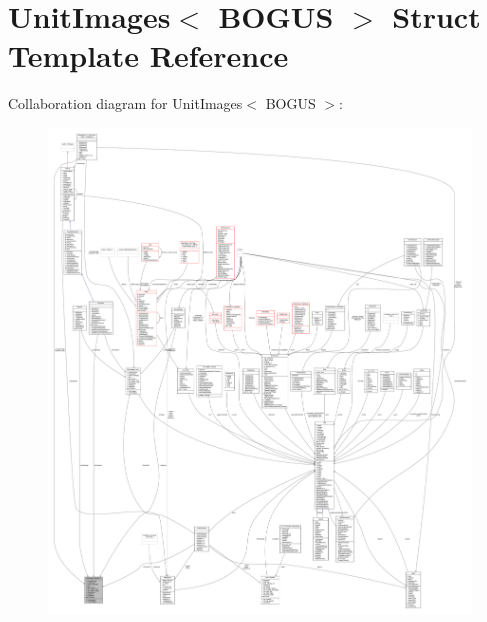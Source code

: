 \hypertarget{structUnitImages}{}\section{Unit\+Images$<$ B\+O\+G\+US $>$ Struct Template Reference}
\label{structUnitImages}


Collaboration diagram for Unit\+Images$<$ B\+O\+G\+US $>$\+:
\nopagebreak
\begin{figure}[H]
\begin{center}
\leavevmode
\includegraphics[width=350pt]{dc/d2a/structUnitImages__coll__graph}
\end{center}
\end{figure}
